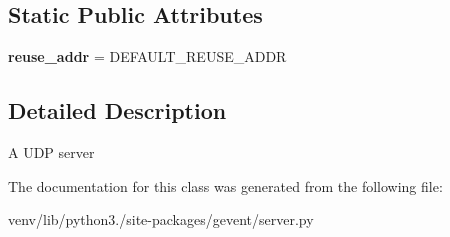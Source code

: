 \subsection*{Static Public Attributes}
\begin{DoxyCompactItemize}
\item 
\mbox{\label{classgevent_1_1server_1_1_datagram_server_ab4009c4343bcd615917e97f4d9db0590}} 
{\bfseries reuse\+\_\+addr} = D\+E\+F\+A\+U\+L\+T\+\_\+\+R\+E\+U\+S\+E\+\_\+\+A\+D\+DR
\end{DoxyCompactItemize}


\subsection{Detailed Description}
\begin{DoxyVerb}A UDP server\end{DoxyVerb}
 

The documentation for this class was generated from the following file\+:\begin{DoxyCompactItemize}
\item 
venv/lib/python3./site-\/packages/gevent/server.\+py\end{DoxyCompactItemize}
